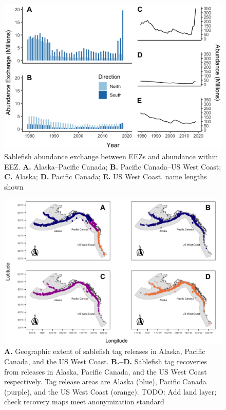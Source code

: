 \documentclass{article}
\newcommand{\lr}[1]{{\color{blue}#1}}
\begin{document}
\begin{figure}[htb]
    \centering
    \includegraphics[width = \textwidth]{figs/bar-abundance-exchange-pool-sml}
    \caption{Sablefish abundance exchange between EEZs and abundance within EEZ. \textbf{A.} Alaska--Pacific Canada; \textbf{B.} Pacific Canada--US West Coast; \textbf{C.} Alaska; \textbf{D.} Pacific Canada; \textbf{E.} US West Coast. \lr{name lengths shown}}
    \label{fig:bar-abundance-exchange-pool-sml}
\end{figure}

\begin{figure}[htb]
    \centering
    \includegraphics[width = \textwidth]{figs/map-released-recovered}
    \caption{\textbf{A.} Geographic extent of sablefish tag releases in Alaska, Pacific Canada, and the US West Coast. \textbf{B.--D.} Sablefish tag recoveries from releases in Alaska, Pacific Canada, and the US West Coast respectively. Tag release areas are Alaska (blue), Pacific Canada (purple), and the US West Coast (orange). \lr{TODO: Add land layer; check recovery maps meet anonymization standard}}
    \label{fig:map-released-recovered}
\end{figure}
\end{document}
